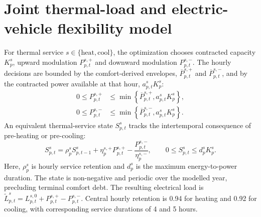 \documentclass[12pt]{article}
\begin{document}
\section{Joint thermal-load and electric-vehicle flexibility model}

For thermal service $s\in\{\mathrm{heat},\mathrm{cool}\}$, the optimization
chooses contracted capacity $K^s_p$, upward modulation $P^{s,+}_{p,t}$ and
downward modulation $P^{s,-}_{p,t}$. The hourly decisions are bounded by the
comfort-derived envelopes, $\overline P^{s,+}_{p,t}$ and
$\overline P^{s,-}_{p,t}$, and by the contracted power available at that
hour, $a^s_{p,t}K^s_p$:
\begin{align}
  0\le P^{s,+}_{p,t}
  &\le
  \min\!\left\{\overline P^{s,+}_{p,t},a^s_{p,t}K^s_p\right\},\\
  0\le P^{s,-}_{p,t}
  &\le
  \min\!\left\{\overline P^{s,-}_{p,t},a^s_{p,t}K^s_p\right\}.
  \label{eq:thermalpower}
\end{align}
An equivalent thermal-service state $S^s_{p,t}$ tracks the intertemporal
consequence of pre-heating or pre-cooling:
\begin{equation}
  S^s_{p,t}
  =
  \rho^s_p S^s_{p,t-1}
  +\eta^{s,+}_p P^{s,+}_{p,t}
  -\frac{P^{s,-}_{p,t}}{\eta^{s,-}_p},
  \qquad
  0\le S^s_{p,t}\le d^s_p K^s_p.
  \label{eq:thermalstate}
\end{equation}
Here, $\rho^s_p$ is hourly service retention and $d^s_p$ is the maximum
energy-to-power duration. The state is non-negative and periodic over the
modelled year, precluding terminal comfort debt. The resulting electrical
load is
$\widetilde L^s_{p,t}=L^{s,0}_{p,t}+P^{s,+}_{p,t}-P^{s,-}_{p,t}$.
Central hourly retention is 0.94 for heating and 0.92 for cooling, with
corresponding service durations of 4 and 5 hours.
\end{document}
